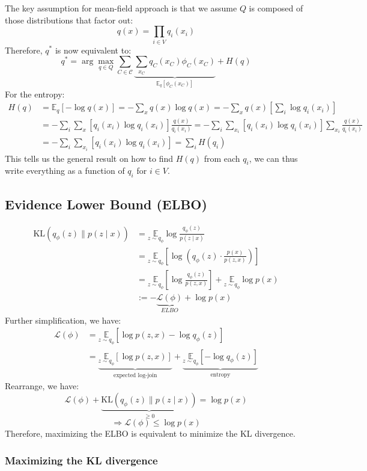 The key assumption for mean-field approach is that we assume $Q$ is composed of those distributions that factor out:
$$q(x)=\prod_{i \in V} q_i\left(x_i\right)$$
Therefore, $q^*$ is now equivalent to:
$$
q^*=\arg \max _{q \in Q} \sum_{C \in \mathcal{C}} \underbrace{\sum_{x_C} q_C\left(x_C\right) \phi_C\left(x_C\right)}_{\mathbb{E}_q\left[\phi_C\left(x_C\right)\right]}+H(q)
$$
For the entropy:
$$
\begin{aligned}
H(q) & =\mathbb{E}_q[-\log q(x)]=-\sum_x q(x) \log q(x)=-\sum_x q(x)\left[\sum_i \log q_i\left(x_i\right)\right] \\
& =-\sum_i \sum_x\left[q_i\left(x_i\right) \log q_i\left(x_i\right)\right] \frac{q(x)}{q_i\left(x_i\right)}=-\sum_i \sum_{x_i}\left[q_i\left(x_i\right) \log q_i\left(x_i\right)\right] \sum_{x_i} \frac{q(x)}{q_i\left(x_i\right)} \\
& =-\sum_i \sum_{x_i}\left[q_i\left(x_i\right) \log q_i\left(x_i\right)\right]=\sum_i H\left(q_i\right)
\end{aligned}
$$
This tells us the general result on how to find $H(q)$ from each $q_i$, we can thus write everything as a function of $q_i$ for $i \in V$.

\subsection{Evidence Lower Bound (ELBO)}
\begin{align*} 
    \mathrm{KL}\left(q_\phi(z) \| p(z \mid x)\right) & =\underset{z \sim q_\phi}{\mathbb{E}} \log \frac{q_\phi(z)}{p(z \mid x)} \\ 
    & =\underset{z \sim q_\phi}{\mathbb{E}}\left[\log \left(q_\phi(z) \cdot \frac{p(x)}{p(z, x)}\right)\right] \\ 
    & =\underset{z \sim q_\phi}{\mathbb{E}}\left[\log \frac{q_\phi(z)}{p(z, x)}\right]+\underset{z \sim q_\phi}{\mathbb{E}} \log p(x) \\ 
    & :=-\underbrace{\mathcal{L}(\phi)}_{ELBO}+\log p(x)
\end{align*}
Further simplification, we have:
\begin{align*}
\mathcal{L}(\phi)&=\underset{z \sim q_\phi}{\mathbb{E}}\left[\log p(z, x)-\log q_\phi(z)\right]\\
&=\underbrace{\underset{z \sim q_\phi}{\mathbb{E}}[\log p(z, x)]}_{\text{expected log-join}}+\underbrace{\underset{z \sim q_\phi}{\mathbb{E}}\left[-\log q_\phi(z)\right]}_{\text{entropy}}
\end{align*}
Rearrange, we have:
$$\mathcal{L}(\phi)+\underbrace{\mathrm{KL}\left(q_\phi(z) \| p(z \mid x)\right)}_{\geq 0}=\log p(x)$$
$$\Rightarrow \mathcal{L}(\phi)\leq \log p(x)$$
Therefore, maximizing the ELBO is equivalent to minimize the KL divergence.
\subsubsection{Maximizing the KL divergence}